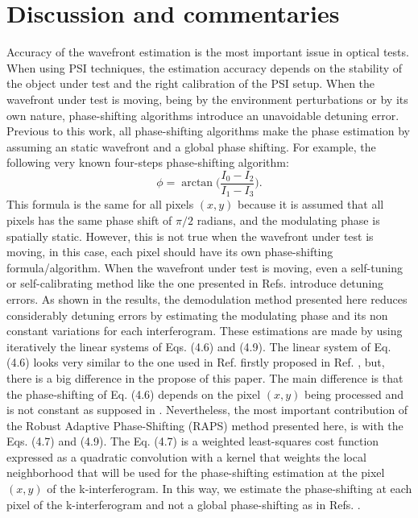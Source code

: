\section{Discussion and commentaries}

Accuracy of the wavefront estimation is the most important issue in optical
tests. When using PSI techniques, the estimation
accuracy depends on the stability of the object under test and the right
calibration of the PSI setup. When the wavefront under test is moving, being by
the environment perturbations or by its own nature, phase-shifting algorithms
introduce an unavoidable detuning error. Previous to this work, all
phase-shifting algorithms make the phase estimation by assuming an static
wavefront and a global phase shifting. For example, the following very known
four-steps phase-shifting algorithm:
\begin{equation}
 \phi = \arctan \Bigg( \frac{I_0-I_2}{I_1-I_3} \Bigg).
\end{equation}
This formula is the same for all pixels $(x,y)$ because it is assumed that all
pixels has the same phase shift of $\pi/2$ radians, and the modulating phase is
spatially static. However, this is not true when the wavefront under test is
moving, in this case, each pixel should have its own phase-shifting
formula/algorithm. When the wavefront under test is moving, even a self-tuning
or self-calibrating method like the one presented in
Refs.\cite{Xu:06,Wang:04,Estrada:10} introduce detuning errors. As
shown in the results, the demodulation method presented here
reduces considerably detuning errors by estimating the modulating phase and its
non constant variations for each interferogram. These estimations are made by
using iteratively the linear systems of Eqs. (4.6) and (4.9). The linear system
of Eq. (4.6) looks very similar to the one used in Ref. \cite{Wang:04}
firstly proposed in Ref. \cite{Morgan}, but, there is a big difference in the
propose of this paper. The main difference is that the phase-shifting of Eq.
(4.6) depends on the pixel $(x,y)$ being processed and
is not constant as supposed in \cite{Wang:04}. Nevertheless, the most
important contribution of the Robust Adaptive Phase-Shifting (RAPS) method
presented here, is with the Eqs. (4.7) and (4.9). The Eq. (4.7) is a weighted
least-squares cost function expressed as a quadratic convolution with a kernel
that weights the local neighborhood that will be used for the phase-shifting
estimation at the pixel $(x,y)$ of the k-interferogram. In this way, we estimate
the phase-shifting at each pixel of the k-interferogram and not a global
phase-shifting as in Refs. \cite{Xu:06,Wang:04}.

